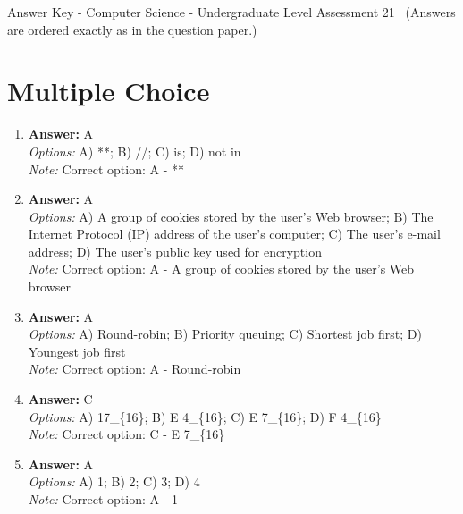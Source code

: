 \documentclass[12pt]{article}
\begin{document}
\begin{center}
Answer Key - Computer Science - Undergraduate Level Assessment 21 \
\small (Answers are ordered exactly as in the question paper.)
\end{center}

\section*{Multiple Choice}
\begin{enumerate}[label=\arabic*.]
\item \textbf{Answer:} A
\\ \textit{Options:} A) **; B) //; C) is; D) not in
\\ \textit{Note:} Correct option: A - **
\item \textbf{Answer:} A
\\ \textit{Options:} A) A group of cookies stored by the user's Web browser; B) The Internet Protocol (IP) address of the user's computer; C) The user's e-mail address; D) The user's public key used for encryption
\\ \textit{Note:} Correct option: A - A group of cookies stored by the user's Web browser
\item \textbf{Answer:} A
\\ \textit{Options:} A) Round-robin; B) Priority queuing; C) Shortest job first; D) Youngest job first
\\ \textit{Note:} Correct option: A - Round-robin
\item \textbf{Answer:} C
\\ \textit{Options:} A) 17\_\{16\}; B) E 4\_\{16\}; C) E 7\_\{16\}; D) F 4\_\{16\}
\\ \textit{Note:} Correct option: C - E 7\_\{16\}
\item \textbf{Answer:} A
\\ \textit{Options:} A) 1; B) 2; C) 3; D) 4
\\ \textit{Note:} Correct option: A - 1
\end{enumerate}
\end{document}
